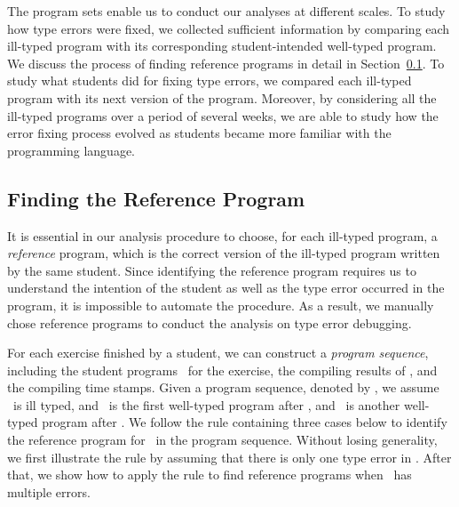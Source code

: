 \documentclass[12pt]{report}	%
\begin{document}
The program sets enable us to conduct our analyses 
at different scales.
To study how type errors were fixed,
we collected sufficient information 
by comparing each ill-typed program with its
corresponding student-intended well-typed program.
We discuss the
process of finding reference programs in detail in
Section~\ref{sec:subject:ref}.
%
To study what students did for fixing type errors,
we compared each ill-typed program with its next version of the program.
Moreover, by considering all the ill-typed programs over a period of several weeks,
we are able to study how the error fixing process evolved as students became more
familiar with the programming language.

\subsection{Finding the Reference Program}
\label{sec:subject:ref}

It is essential in our analysis procedure to choose,
for each ill-typed program,
a \emph{reference} program, which is the correct version of
the ill-typed program written by the same student.
Since identifying the reference program requires us to
understand the intention of the student
as well as the type error occurred in the program, it is impossible
to automate the procedure.
As a result, we manually chose reference programs
to conduct the analysis on type error debugging.


%



For each exercise finished by a student, we can
construct a \emph{program sequence},
including the student programs \ for the exercise,
the compiling results of , and the compiling time stamps.
%
%
Given a program sequence, denoted by \sseqijk,
we assume \pgi\ is ill typed, 
and \pgj\ is the first well-typed program after \pgi, 
and \pgk\ is another well-typed program after \pgj.
We follow the rule containing three cases below to
identify the reference program for \pgi\ in
the program sequence.
Without losing generality, we first illustrate the rule
by assuming that there is only one type error in \pgi.
After that, we show how to apply the rule to
find reference programs when \pgi\ has multiple errors.
\end{document}
